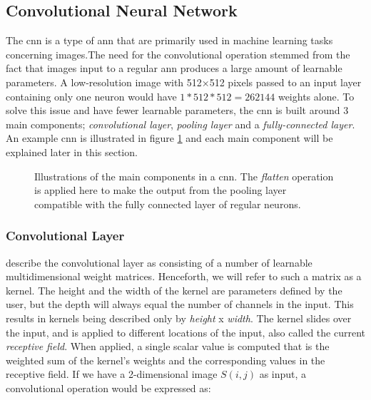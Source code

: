\subsection{Convolutional Neural Network} \label{cnn}
    The \gls{cnn} is a type of \gls{ann} that are primarily used in machine learning tasks concerning images\cite{o2015introduction_convolutions}.The need for the convolutional operation stemmed from the fact that images input to a regular \gls{ann} produces a large amount of learnable parameters. A low-resolution image with 512×512 pixels passed to an input layer containing only one neuron would have $1*512*512 = 262144$ weights alone.  To solve this issue and have fewer learnable parameters, the \gls{cnn} is built around 3 main components\cite{o2015introduction_convolutions}; \textit{convolutional layer}, \textit{pooling layer} and a \textit{fully-connected layer}. An example \gls{cnn} is illustrated in figure \ref{convolutional_neural_network_fig} and each main component will be explained later in this section.

    \begin{figure}[H]
        \centering
                        
        \caption[Convolutional neural network example]{Illustrations of the main components in a \gls{cnn}. The \textit{flatten} operation is applied here to make the output from the pooling layer compatible with the fully connected layer of regular neurons.}
      	\medskip 
        \label{convolutional_neural_network_fig}
    \end{figure}
    
    \subsubsection{Convolutional Layer}
     \citeauthor{o2015introduction_convolutions}\cite{o2015introduction_convolutions} describe the convolutional layer as consisting of a number of learnable multidimensional weight matrices. Henceforth, we will refer to such a matrix as a kernel. The height and the width of the kernel are parameters defined by the user, but the depth will always equal the number of channels in the input. This results in kernels being described only by \textit{height} x \textit{width}. The kernel slides over the input, and is applied to different locations of the input, also called the current \textit{receptive field}. When applied, a single scalar value is computed that is the weighted sum of the kernel's weights and the corresponding values in the receptive field. If we have a 2-dimensional image $S(i,j)$ as input, a convolutional operation would be expressed as\cite{Goodfellow-et-al-2016_convolution}:
     
